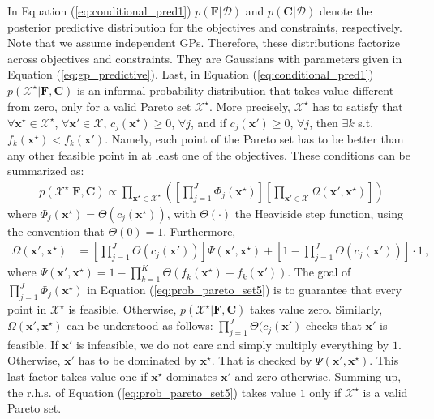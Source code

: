 In Equation (\ref{eq:conditional_pred1}) $p(\mathbf{F}|\mathcal{D})$ and $p(\mathbf{C}|\mathcal{D})$
denote the posterior predictive distribution for the objectives and constraints, respectively. Note that
we assume independent GPs. Therefore, these distributions factorize across objectives and constraints.
They are Gaussians with parameters given in Equation (\ref{eq:gp_predictive}).
Last, in Equation (\ref{eq:conditional_pred1}) $p(\mathcal{X}^\star|\mathbf{F},\mathbf{C})$ is an informal probability
distribution that takes value different from zero, only for a valid Pareto set $\mathcal{X}^\star$. 
More precisely, $\mathcal{X}^\star$ has to satisfy that $\forall \mathbf{x}^\star \in 
\mathcal{X}^\star$, $\forall \mathbf{x}' \in \mathcal{X}$, $c_j(\mathbf{x}^\star) \geq 0$, 
$\forall j$, and if $c_j(\mathbf{x}') \geq 0$, $\forall j$, then $\exists k$ s.t.
$f_k(\mathbf{x}^\star) < f_k(\mathbf{x}')$. Namely, each point of the Pareto set
has to be better than any other feasible point in at least one of the objectives.
These conditions can be summarized as:
\begin{align}
p(\mathcal{X}^\star|\mathbf{F},\mathbf{C}) \propto 
	\prod_{\mathbf{x}^\star \in \mathcal{X}^\star}
	\left( \left[ \prod_{j=1}^J \Phi_j(\mathbf{x}^\star) \right] \left[ \prod_{\mathbf{x}'\in \mathcal{X}}
	\Omega(\mathbf{x}',\mathbf{x}^\star)\right]
	\right) 
	\label{eq:prob_pareto_set5}
\end{align}
where $\Phi_j(\mathbf{x}^\star)=\Theta(c_j(\mathbf{x}^\star))$, with $\Theta(\cdot)$ the
Heaviside step function, using the convention that $\Theta(0)=1$. 
Furthermore, 
\begin{align}
\Omega(\mathbf{x}',\mathbf{x}^\star) &= \left[ \prod_{j=1}^J \Theta(c_j(\mathbf{x}')) \right]
\Psi(\mathbf{x}',\mathbf{x}^\star) + \left[1 - \prod_{j=1}^J \Theta(c_j(\mathbf{x}')) \right] \cdot 1\,,
\end{align}
where $\Psi(\mathbf{x}',\mathbf{x}^\star) = 1 - \prod_{k=1}^K \Theta(f_k(\mathbf{x}^\star) - f_k(\mathbf{x}'))$.
The goal of $\prod_{j=1}^J \Phi_j(\mathbf{x}^\star) $ in Equation (\ref{eq:prob_pareto_set5}) is to guarantee that every
point in $\mathcal{X}^\star$ is feasible. Otherwise, $p(\mathcal{X}^\star|\mathbf{F},\mathbf{C})$ takes value zero.
Similarly, $\Omega(\mathbf{x}',\mathbf{x}^\star)$ can be understood as follows:
$\prod_{j=1}^J \Theta(c_j(\mathbf{x}')$ checks that $\mathbf{x}'$ is feasible. If $\mathbf{x}'$
is infeasible, we do not care and simply multiply everything by $1$. Otherwise, $\mathbf{x}'$ has to be
dominated by $\mathbf{x}^\star$. That is checked by $\Psi(\mathbf{x}',\mathbf{x}^\star)$. This last factor takes
value one if $\mathbf{x}^\star$ dominates $\mathbf{x}'$ and zero otherwise.
Summing up, the r.h.s. of Equation (\ref{eq:prob_pareto_set5}) takes value $1$ only if $\mathcal{X}^\star$ is a valid Pareto set.

